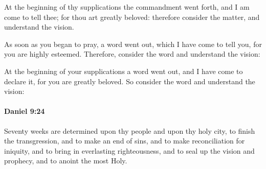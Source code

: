 			\begin{versebox}
					\item[BHS] 
					\item[LXX] 
					\item[ASV] At the beginning of thy supplications the commandment went forth, and I am come to tell thee; for thou art greatly beloved: therefore consider the matter, and understand the vision.
					\item[NIV] As soon as you began to pray, a word went out, which I have come to tell you, for you are highly esteemed. Therefore, consider the word and understand the vision:
					\item[NRSV] At the beginning of your supplications a word went out, and I have come to declare it, for you are greatly beloved. So consider the word and understand the vision:
			\end{versebox}

		\paragraph{Daniel 9:24} %
			\label{DANIEL-9-24}

			Seventy weeks are determined upon thy people and upon thy holy city, to finish the transgression, and to make an end of sins, and to make reconciliation for iniquity, and to bring in everlasting righteousness, and to seal up the vision and prophecy, and to anoint the most Holy.

